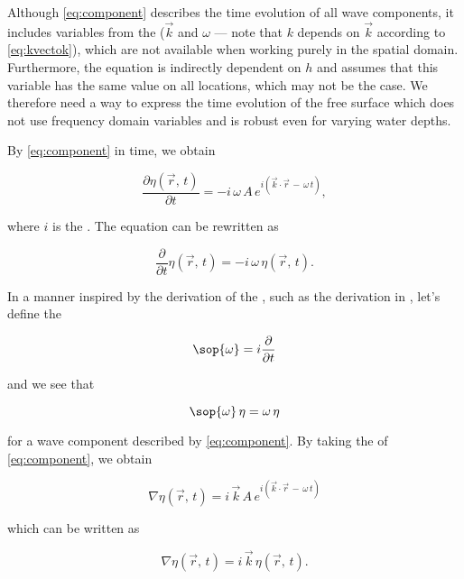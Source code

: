 Although \eqref{eq:component} describes the time evolution of all wave components, it includes variables from the  ($\vec{k}$ and $\omega$ --- note that $k$ depends on $\vec{k}$ according to \eqref{eq:kvectok}), which are not available when working purely in the spatial domain. Furthermore, the equation is indirectly dependent on $h$ and assumes that this variable has the same value on all locations, which may not be the case. We therefore need a way to express the time evolution of the free surface which does not use frequency domain variables and is robust even for varying water depths.

By  \eqref{eq:component} in time, we obtain

\begin{equation}
\frac{\partial\eta(\vec{r},\,t)}{\partial t} = -i\,\omega\,A\,e^{i(\vec{k}\cdot\vec{r}\,-\,\omega\,t)},
\end{equation}

where $i$ is the . The equation can be rewritten as

\begin{equation}
\frac{\partial}{\partial t}\eta(\vec{r},\,t) = -i\,\omega\,\eta(\vec{r},\,t).
\end{equation}

In a manner inspired by the derivation of the , such as the derivation in \citep{Bransden2000}, let's define the 

\begin{equation} \label{eq:opomega}
\sop{\omega} = i\frac{\partial}{\partial t}
\end{equation}

and we see that

\begin{equation} \label{eq:opomegaaction}
\sop{\omega}\,\eta = \omega\,\eta
\end{equation}

for a wave component described by \eqref{eq:component}. By taking the  of \eqref{eq:component}, we obtain

\begin{equation}
\nabla\eta(\vec{r},\,t) = i\,\vec{k}\,A\,e^{i(\vec{k}\cdot\vec{r}\,-\,\omega\,t)}
\end{equation}

which can be written as

\begin{equation}
\nabla\eta(\vec{r},\,t) = i\,\vec{k}\,\eta(\vec{r},\,t).
\end{equation}


